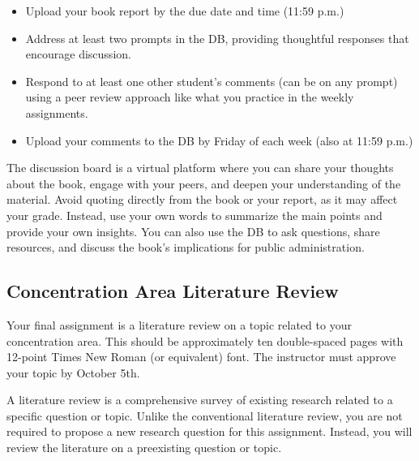 \documentclass[12pt, letterpaper]{article}
\begin{document}
    \begin{itemize}
        \item Upload your book report by the due date and time (11:59 p.m.)
        \item Address at least two prompts in the DB, providing thoughtful responses that encourage discussion.
        \item Respond to at least one other student’s comments (can be on any prompt) using a peer review approach like what you practice in the weekly assignments.
        \item Upload your comments to the DB by Friday of each week (also at 11:59 p.m.)
    \end{itemize}

The discussion board is a virtual platform where you can share your thoughts about the book, engage with your peers, and deepen your understanding of the material. Avoid quoting directly from the book or your report, as it may affect your grade. Instead, use your own words to summarize the main points and provide your own insights. You can also use the DB to ask questions, share resources, and discuss the book’s implications for public administration.

\subsection{Concentration Area Literature Review}

Your final assignment is a literature review on a topic related to your concentration area. This should be approximately ten double-spaced pages with 12-point Times New Roman (or equivalent) font. The instructor must approve your topic by October 5th.

A literature review is a comprehensive survey of existing research related to a specific question or topic. Unlike the conventional literature review, you are not required to propose a new research question for this assignment. Instead, you will review the literature on a preexisting question or topic.
\end{document}
